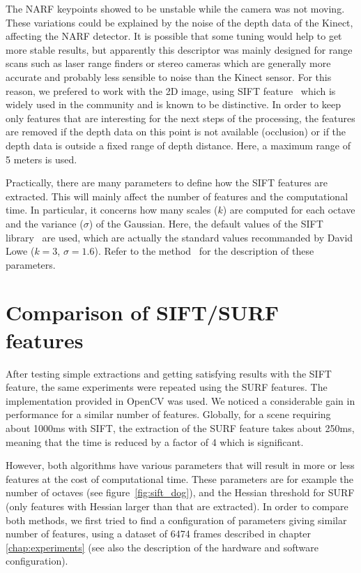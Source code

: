 The \gls{NARF} keypoints showed to be unstable while the camera was not moving. These variations could be explained by the noise of the depth data of the Kinect, affecting the \gls{NARF} detector. It is possible that some tuning would help to get more stable results, but apparently this descriptor was mainly designed for range scans such as laser range finders or stereo cameras which are generally more accurate and probably less sensible to noise than the Kinect sensor. For this reason, we prefered to work with the 2D image, using \gls{SIFT} feature~\cite{lowe_2004_sift} which is widely used in the community and is known to be distinctive. In order to keep only features that are interesting for the next steps of the processing, the features are removed if the depth data on this point is not available (occlusion) or if the depth data is outside a fixed range of depth distance. Here, a maximum range of 5 meters is used.

Practically, there are many parameters to define how the \gls{SIFT} features are extracted. This will mainly affect the number of features and the computational time. In particular, it concerns how many scales ($k$) are computed for each octave and the variance ($\sigma$) of the Gaussian. Here, the default values of the \gls{SIFT} library~\cite{hess_sift} are used, which are actually the standard values recommanded by David Lowe ($k=3$, $\sigma=1.6$). Refer to the method~\cite{lowe_2004_sift} for the description of these parameters.

\clearpage
\section{Comparison of SIFT/SURF features}
After testing simple extractions and getting satisfying results with the \gls{SIFT} feature, the same experiments were repeated using the \gls{SURF} features. The implementation provided in OpenCV was used. We noticed a considerable gain in performance for a similar number of features. Globally, for a scene requiring about 1000ms with \gls{SIFT}, the extraction of the \gls{SURF} feature takes about 250ms, meaning that the time is reduced by a factor of 4 which is significant.

However, both algorithms have various parameters that will result in more or less features at the cost of computational time. These parameters are for example the number of octaves (see figure~\ref{fig:sift_dog}), and the Hessian threshold for SURF (only features with Hessian larger than that are extracted). In order to compare both methods, we first tried to find a configuration of parameters giving similar number of features, using a dataset of 6474 frames described in chapter \ref{chap:experiments} (see also the description of the hardware and software configuration).

